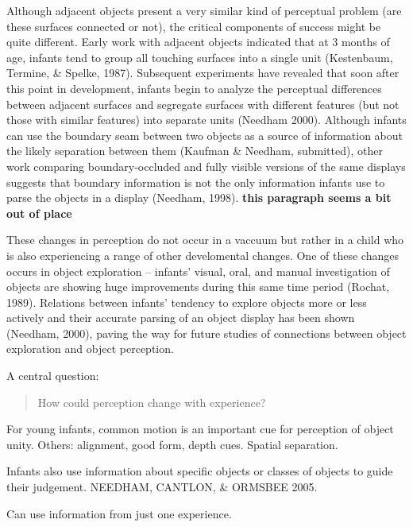 Although adjacent objects present a very similar kind of perceptual
problem (are these surfaces connected or not), the critical components
of success might be quite different.  Early work with adjacent objects
indicated that at 3 months of age, infants tend to group all touching
surfaces into a single unit (Kestenbaum, Termine, \& Spelke, 1987).
Subsequent experiments have revealed that soon after this point in
development, infants begin to analyze the perceptual differences
between adjacent surfaces and segregate surfaces with different
features (but not those with similar features) into separate units
(Needham 2000).  Although infants can use the boundary seam between
two objects as a source of information about the likely separation
between them (Kaufman \& Needham, submitted), other work comparing
boundary-occluded and fully visible versions of the same displays
suggests that boundary information is not the only information infants
use to parse the objects in a display (Needham, 1998).  
{\bf this paragraph seems a bit out of place}

These changes in perception do not occur in a vaccuum but rather in a
child who is also experiencing a range of other develomental changes.
One of these changes occurs in object
exploration -- infants' visual, oral, and manual
investigation of objects are showing huge improvements during this
same time period (Rochat, 1989).  Relations between infants'
tendency to explore objects more or less actively and their accurate
parsing of an object display has been shown (Needham, 2000), paving
the way for future studies of connections between object exploration
and object perception.




A central question:

\begin{quote}

How could perception change with experience?

\end{quote}





For young infants, common motion is an important cue for 
perception of object unity.  Others: alignment, good form,
depth cues.  Spatial separation.

Infants also use information about specific objects or
classes of objects to guide their judgement.  
NEEDHAM, CANTLON, \& ORMSBEE 2005.

Can use information from just one experience.

